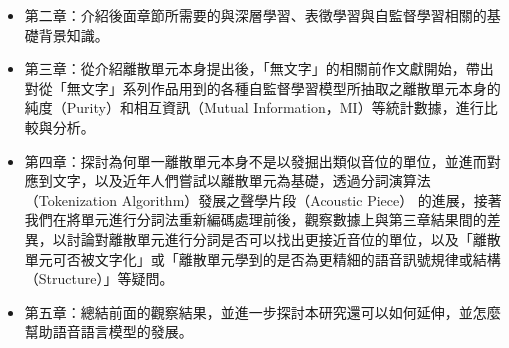 \begin{itemize} \itemsep -2pt
  \item 第二章：介紹後面章節所需要的與深層學習、表徵學習與自監督學習相關的基礎背景知識。
  \item 第三章：從介紹離散單元本身提出後，「無文字」的相關前作文獻開始，帶出對從「無文字」系列作品用到的各種自監督學習模型所抽取之離散單元本身的純度（Purity）和相互資訊（Mutual Information，MI）等統計數據，進行比較與分析。
  \item 第四章：探討為何單一離散單元本身不是以發掘出類似音位的單位，並進而對應到文字，以及近年人們嘗試以離散單元為基礎，透過分詞演算法（Tokenization Algorithm）發展之聲學片段（Acoustic Piece） 的進展，接著我們在將單元進行分詞法重新編碼處理前後，觀察數據上與第三章結果間的差異，以討論對離散單元進行分詞是否可以找出更接近音位的單位，以及「離散單元可否被文字化」或「離散單元學到的是否為更精細的語音訊號規律或結構（Structure）」等疑問。
  \item 第五章：總結前面的觀察結果，並進一步探討本研究還可以如何延伸，並怎麼幫助語音語言模型的發展。
\end{itemize}
